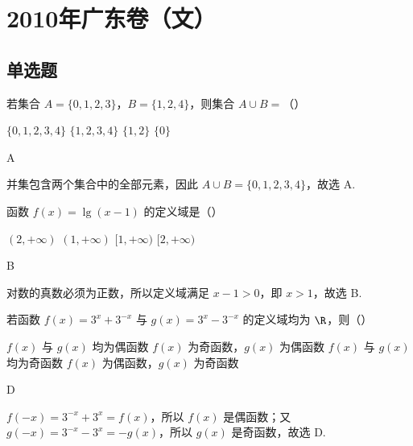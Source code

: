 \chapter{2010年广东卷（文）}

\section{单选题}

\begin{problem}
若集合 \(A = \{0, 1, 2, 3\}\)，\(B = \{1, 2, 4\}\)，则集合 \(A \cup B =\)（\quad）

\choices
    {\(\{0, 1, 2, 3, 4\}\)}
    {\(\{1, 2, 3, 4\}\)}
    {\(\{1, 2\}\)}
    {\(\{0\}\)}
\end{problem}

\begin{answer}
A
\end{answer}

\begin{solution}
并集包含两个集合中的全部元素，因此
\(A\cup B=\{0,1,2,3,4\}\)，故选 A.
\end{solution}

\begin{problem}
函数 \(f(x) = \lg(x - 1)\) 的定义域是（\quad）

\choices
    {\((2, +\infty)\)}
    {\((1, +\infty)\)}
    {\([1, +\infty)\)}
    {\([2, +\infty)\)}
\end{problem}

\begin{answer}
B
\end{answer}

\begin{solution}
对数的真数必须为正数，所以定义域满足 \(x-1>0\)，即 \(x>1\)，故选 B.
\end{solution}

\begin{problem}
若函数 \(f(x) = 3^x + 3^{-x}\) 与 \(g(x) = 3^x - 3^{-x}\) 的定义域均为 \(\R\)，则（\quad）

\choices
    {\(f(x)\) 与 \(g(x)\) 均为偶函数}
    {\(f(x)\) 为奇函数，\(g(x)\) 为偶函数}
    {\(f(x)\) 与 \(g(x)\) 均为奇函数}
    {\(f(x)\) 为偶函数，\(g(x)\) 为奇函数}
\end{problem}

\begin{answer}
D
\end{answer}

\begin{solution}
\(f(-x)=3^{-x}+3^x=f(x)\)，所以 \(f(x)\) 是偶函数；又
\(g(-x)=3^{-x}-3^x=-g(x)\)，所以 \(g(x)\) 是奇函数，故选 D.
\end{solution}

